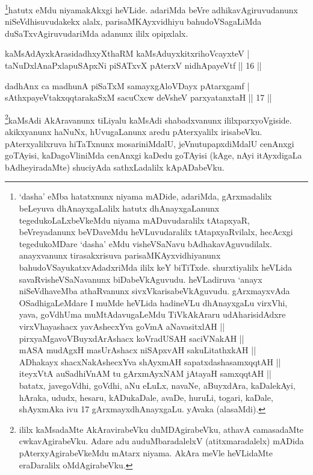 \begin{artha}
\footnote{`dasha' eMba hatatxnunx niyama mADide, adariMda, gArxmadalilx beLeyuva dhAnayxgaLalilx hatutx dhAnayxgaLanunx tegedukoLaLxbeVkeMdu niyama mADuvudaralilx tAtapxyaR, beVreyadanunx beVDaveMdu heVLuvudaralilx tAtapxyaRvilalx, hecAcxgi tegedukoMDare `dasha' eMdu visheVSaNavu bAdhakavAguvudilalx. anayxvanunx tirasakxrisuva parisaMKAyxvidhiyanunx bahudoVSayukatxvAdadxriMda ililx keY biTiTxde. shurxtiyalilx heVLida savaRvisheVSaNavanunx biDabeVkAguvudu. heVLadiruva `anayx niSeVdhaveMba athaRvanunx sivxVkarisabeVkAguvudu. gArxmayxvAda OSadhigaLeMdare I muMde heVLida hadineVLu dhAnayxgaLu \ndash  virxVhi, yava, goVdhUma muMtAdavugaLeMdu TiVkAkAraru udAharisidAdxre \mdash  \\ 
virxVhayashacx yavAshecxYva goVmA aNavasitxlAH ||\\
pirxyaMgavoV\s BuyxdArAshacx koVradUSAH saciVNakAH ||\\
mASA mudAgxH masUrAshacx niSApxvAH sakuLitathxkAH ||\\
ADhakayx shacxNakAshecxYva shAyxmAH sapatxdashasamxqqtAH ||\\
iteyxVtA auSadhiVnAM tu gArxmAyxNAM jAtayaH samxqqtAH ||\\ batatx, javegoVdhi, goVdhi, aNu eLuLx, navaNe, aBuyxdAra, kaDalekAyi, hAraka, ududx, hesaru, kADukaDale, avaDe, huruLi, togari, kaDale, shAyxmAka ivu 17 gArxmayxdhAnayxgaLu. yAvaka (alasaMdi).}hatutx eMdu niyamakAkxgi heVLide. adariMda beVre adhikavAgiruvudanunx niSeVdhisuvudakekx alalx, parisaMKAyxvidhiyu bahudoVSagaLiMda duSaTxvAgiruvudariMda adanunx ililx opipxlalx.
\end{artha}



\begin{shl}
kaMsAdAyxkArasidadhxyXthaRM kaMsAduyxkitxrihoVcayxteV | \\
taNuDxlAnaPxlapuSApxNi piSATxvX pAterxV nidhApayeVtf \hfill|| 16 || 
\end{shl}

\begin{shl}
dadhAnx ca madhunA piSaTxM samayxgAloVDayx pAtarxgamf | \\
sAthxpayeVtakxqqtarakaSxM sacuCxcw deVsheV parxyatanxtaH \hfill|| 17 || 
\end{shl}

\begin{artha}
\footnote{ililx kaMsadaMte AkAravirabeVku duMDAgirabeVku, athavA camasadaMte cwkavAgirabeVku. Adare adu auduMbaradalelxV (atitxmaradalelx) mADida pAterxyAgirabeVkeMdu mAtarx niyama. AkAra meVle heVLidaMte eraDaralilx oMdAgirabeVku.}kaMsAdi AkAravanunx tiLiyalu kaMsAdi shabadxvanunx ililx\break parxyoVgiside. akikxyanunx haNuNx, hUvugaLanunx aredu pAterxyalilx irisabeVku. pAterxyalilxruva hiTaTxnunx mosariniMdalU, jeVnutupapx\-\break diMdalU cenAnxgi goTAyisi, kaDagoVliniMda  cenAnxgi kaDedu goTAyisi (kAge, nAyi itAyxdigaLa bAdheyiradaMte) shuciyAda sathxLadalilx kApADabeVku.
\end{artha}

